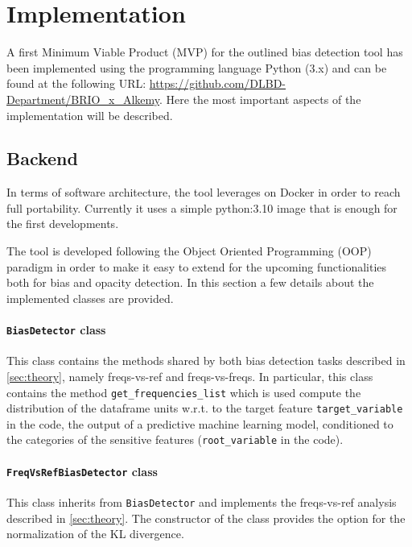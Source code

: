 \documentclass[
]{ceurart}
\begin{document}
\section{Implementation}
\label{sec:implementation}

A first Minimum Viable Product (MVP) for the outlined bias detection tool has been implemented using the programming language Python (3.x) and can be found at the following URL: \url{https://github.com/DLBD-Department/BRIO_x_Alkemy}. Here the most important aspects of the implementation will be described.

\subsection{Backend}
\label{subsec:backend}

In terms of software architecture, the tool leverages on Docker in order to reach full portability. Currently it uses a simple python:3.10 image that is enough for the first developments. 

The tool is developed following the Object Oriented Programming (OOP) paradigm in order to make it easy to extend for the upcoming functionalities both for bias and opacity detection. In this section a few details about the implemented classes are provided. 

\paragraph{\lstinline[columns=fixed]{BiasDetector} class}
This class contains the methods shared by both bias detection tasks described in \ref{sec:theory}, namely freqs-vs-ref and freqs-vs-freqs. In particular, this class contains the method \lstinline[columns=fixed]{get_frequencies_list} which is used compute the distribution of the dataframe units w.r.t. to the target feature \lstinline[columns=fixed]{target_variable} in the code, the output of a predictive machine learning model, conditioned to the categories of the sensitive features (\lstinline[columns=fixed]{root_variable} in the code). 

\paragraph{\lstinline[columns=fixed]{FreqVsRefBiasDetector} class}
This class inherits from \lstinline[columns=fixed]{BiasDetector} and implements the freqs-vs-ref analysis described in \ref{sec:theory}. The constructor of the class provides the option for the normalization of the KL divergence.  
\end{document}
